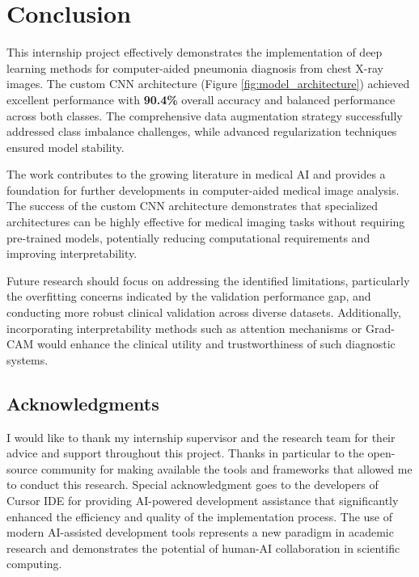 \documentclass[conference]{IEEEtran}
\begin{document}
\section{Conclusion}

This internship project effectively demonstrates the implementation of deep learning methods for computer-aided pneumonia diagnosis from chest X-ray images. The custom CNN architecture (Figure \ref{fig:model_architecture}) achieved excellent performance with \textbf{90.4\%} overall accuracy and balanced performance across both classes. The comprehensive data augmentation strategy successfully addressed class imbalance challenges, while advanced regularization techniques ensured model stability.

The work contributes to the growing literature in medical AI and provides a foundation for further developments in computer-aided medical image analysis. The success of the custom CNN architecture demonstrates that specialized architectures can be highly effective for medical imaging tasks without requiring pre-trained models, potentially reducing computational requirements and improving interpretability.

Future research should focus on addressing the identified limitations, particularly the overfitting concerns indicated by the validation performance gap, and conducting more robust clinical validation across diverse datasets. Additionally, incorporating interpretability methods such as attention mechanisms or Grad-CAM would enhance the clinical utility and trustworthiness of such diagnostic systems.

\subsection*{Acknowledgments}
I would like to thank my internship supervisor and the research team for their advice and support throughout this project. Thanks in particular to the open-source community for making available the tools and frameworks that allowed me to conduct this research. Special acknowledgment goes to the developers of Cursor IDE for providing AI-powered development assistance that significantly enhanced the efficiency and quality of the implementation process. The use of modern AI-assisted development tools represents a new paradigm in academic research and demonstrates the potential of human-AI collaboration in scientific computing.
\end{document}
